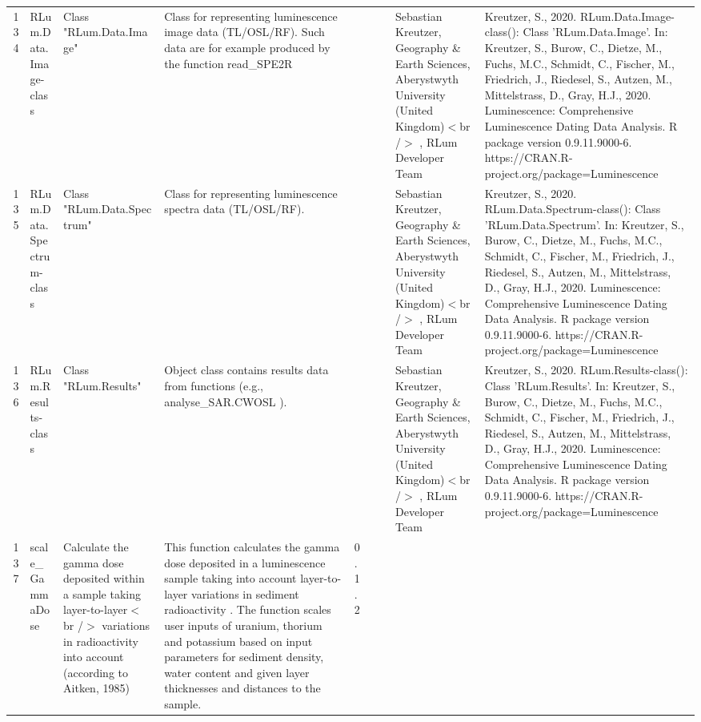 \begin{table}[ht]
\begin{tabular}{rllllllll}
 \\ 
  134 & RLum.Data.Image-class & Class  "RLum.Data.Image" & Class for representing luminescence image data (TL/OSL/RF). Such data are for example produced by the function  read\_SPE2R &  &  &  & Sebastian Kreutzer, Geography \& Earth Sciences, Aberystwyth University (United Kingdom)$<$br /$>$ , RLum Developer Team & Kreutzer, S., 2020. RLum.Data.Image-class(): Class 'RLum.Data.Image'. In: Kreutzer, S., Burow, C., Dietze, M., Fuchs, M.C., Schmidt, C., Fischer, M., Friedrich, J., Riedesel, S., Autzen, M., Mittelstrass, D., Gray, H.J., 2020. Luminescence: Comprehensive Luminescence Dating Data Analysis. R package version 0.9.11.9000-6. https://CRAN.R-project.org/package=Luminescence
 \\ 
  135 & RLum.Data.Spectrum-class & Class  "RLum.Data.Spectrum" & Class for representing luminescence spectra data (TL/OSL/RF). &  &  &  & Sebastian Kreutzer, Geography \& Earth Sciences, Aberystwyth University (United Kingdom)$<$br /$>$ , RLum Developer Team & Kreutzer, S., 2020. RLum.Data.Spectrum-class(): Class 'RLum.Data.Spectrum'. In: Kreutzer, S., Burow, C., Dietze, M., Fuchs, M.C., Schmidt, C., Fischer, M., Friedrich, J., Riedesel, S., Autzen, M., Mittelstrass, D., Gray, H.J., 2020. Luminescence: Comprehensive Luminescence Dating Data Analysis. R package version 0.9.11.9000-6. https://CRAN.R-project.org/package=Luminescence
 \\ 
  136 & RLum.Results-class & Class  "RLum.Results" & Object class contains results data from functions (e.g.,  analyse\_SAR.CWOSL ). &  &  &  & Sebastian Kreutzer, Geography \& Earth Sciences, Aberystwyth University (United Kingdom)$<$br /$>$ , RLum Developer Team & Kreutzer, S., 2020. RLum.Results-class(): Class 'RLum.Results'. In: Kreutzer, S., Burow, C., Dietze, M., Fuchs, M.C., Schmidt, C., Fischer, M., Friedrich, J., Riedesel, S., Autzen, M., Mittelstrass, D., Gray, H.J., 2020. Luminescence: Comprehensive Luminescence Dating Data Analysis. R package version 0.9.11.9000-6. https://CRAN.R-project.org/package=Luminescence
 \\ 
  137 & scale\_GammaDose & Calculate the gamma dose deposited within a sample taking layer-to-layer$<$br /$>$ variations in radioactivity into account (according to Aitken, 1985) & This function calculates the gamma dose deposited in a luminescence sample taking into account layer-to-layer variations in sediment radioactivity . The function scales user inputs of uranium, thorium and potassium based on input parameters for sediment density, water content and given layer thicknesses and distances to the sample. & 0.1.2

\end{tabular}
\end{table}
